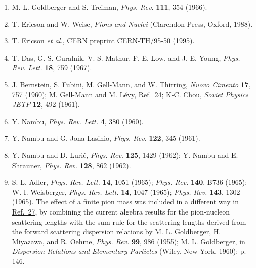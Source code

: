 \begin{enumerate}
\item {}\label{ch19-ref-11}
M. L. Goldberger and S. Treiman, \emph{Phys. Rev.} \textbf{111}, 354 (1966).

\item {}\label{ch19-ref-12}
T. Ericson and W. Weise, \emph{Pions and Nuclei} (Clarendon Press, Oxford, 1988).

\item {}\label{ch19-ref-13}
T. Ericson \emph{et al.}, CERN preprint CERN-TH/95-50 (1995).

\item {}\label{ch19-ref-14}
T. Das, G. S. Guralnik, V. S. Mathur, F. E. Low, and J. E. Young, \emph{Phys. Rev. Lett.} \textbf{18}, 759 (1967).

\item {}\label{ch19-ref-15}
J. Bernstein, S. Fubini, M. Gell-Mann, and W. Thirring, \emph{Nuovo Cimento} \textbf{17}, 757 (1960); M. Gell-Mann and M. L\'evy, \hyperref[ch19-ref-24]{Ref.~24}; K-C. Chou, \emph{Soviet Physics JETP} \textbf{12}, 492 (1961).

\item {}\label{ch19-ref-16}
Y. Nambu, \emph{Phys. Rev. Lett.} \textbf{4}, 380 (1960).

\item {}\label{ch19-ref-17}
Y. Nambu and G. Jona-Lasinio, \emph{Phys. Rev.} \textbf{122}, 345 (1961).

\item {}\label{ch19-ref-18}
Y. Nambu and D. Luri\'e, \emph{Phys. Rev.} \textbf{125}, 1429 (1962); Y. Nambu and E. Shrauner, \emph{Phys. Rev.} \textbf{128}, 862 (1962).

\item {}\label{ch19-ref-19}
S. L. Adler, \emph{Phys. Rev. Lett.} \textbf{14}, 1051 (1965); \emph{Phys. Rev.} \textbf{140}, B736 (1965); W. I. Weisberger, \emph{Phys. Rev. Lett.} \textbf{14}, 1047 (1965); \emph{Phys. Rev.} \textbf{143}, 1302 (1965). The effect of a finite pion mass was included in a different way in \hyperref[ch19-ref-27]{Ref.~27}, by combining the current algebra results for the pion-nucleon scattering lengths with the sum rule for the scattering lengths derived from the forward scattering dispersion relations by M. L. Goldberger, H. Miyazawa, and R. Oehme, \emph{Phys. Rev.} \textbf{99}, 986 (1955); M. L. Goldberger, in \emph{Dispersion Relations and Elementary Particles} (Wiley, New York, 1960): p. 146.


\end{enumerate}
